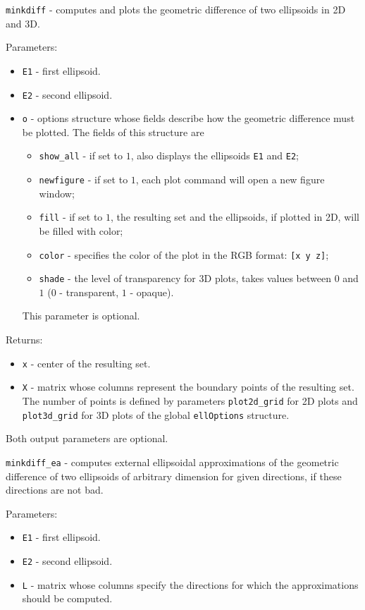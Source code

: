 \documentclass{report}
\begin{document}
{\Large {\tt minkdiff}} - computes and plots the geometric difference of
two ellipsoids in 2D and 3D.

Parameters:
\begin{itemize}
\item {\tt E1} - first ellipsoid.
\item {\tt E2} - second ellipsoid.
\item {\tt o} - options structure whose fields describe how the geometric
difference must be plotted. The fields of this structure are
\begin{itemize}
\item {\tt show\_all} - if set to $1$, also displays the ellipsoids
{\tt E1} and {\tt E2};
\item {\tt newfigure} - if set to $1$, each plot command will open a new
figure window;
\item {\tt fill} - if set to $1$, the resulting set and the ellipsoids,
if plotted in 2D, will be filled with color;
\item {\tt color} - specifies the color of the plot in the RGB format:
{\tt [x y z]};
\item {\tt shade} - the level of transparency for 3D plots, takes values
between $0$ and $1$ ($0$ - transparent, $1$ - opaque).
\end{itemize}
This parameter is optional.
\end{itemize}

Returns:
\begin{itemize}
\item {\tt x} - center of the resulting set.
\item {\tt X} - matrix whose columns represent the boundary points of the
resulting set. The number of points is defined by parameters
{\tt plot2d\_grid} for 2D plots and {\tt plot3d\_grid} for 3D plots of the
global {\tt ellOptions} structure.
\end{itemize}
Both output parameters are optional.

\newpage

{\Large {\tt minkdiff\_ea}} - computes external ellipsoidal approximations
of the geometric difference of two ellipsoids of arbitrary dimension
for given directions, if these directions are not bad.

Parameters:
\begin{itemize}
\item {\tt E1} - first ellipsoid.
\item {\tt E2} - second ellipsoid.
\item {\tt L} - matrix whose columns specify the directions for which
the approximations should be computed.
\end{itemize}
\end{document}
